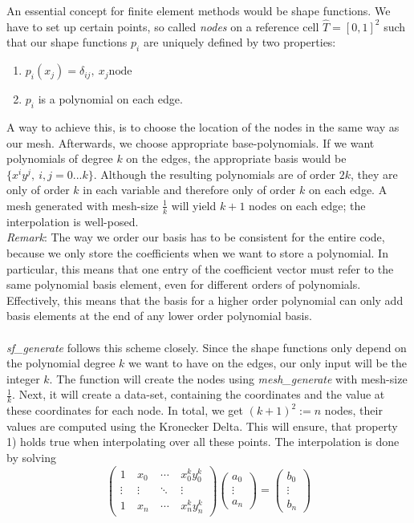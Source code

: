 \documentclass[a4paper,12pt]{article}
\begin{document}
An essential concept for finite element methods would be shape functions. We have to set up certain points, so called \textit{nodes} on a reference cell $\hat T = [0,1]^2$ such that our shape functions $p_i$ are uniquely defined by two properties: 
\begin{enumerate}
\item $p_i(x_j)=\delta_{ij}, \ x_j \mbox{node}$
\item $p_i$ is a polynomial on each edge.
\end{enumerate} 
A way to achieve this, is to choose the location of the nodes in the same way as our mesh. Afterwards, we choose appropriate base-polynomials. If we want polynomials of degree $k$ on the edges, the appropriate basis would be $\{x^iy^j, \ i,j=0...k\}$. Although the resulting polynomials are of order $2k$, they are only of order $k$ in each variable and therefore only of order $k$ on each edge. A mesh generated with mesh-size $\frac{1}{k}$ will yield $k+1$ nodes on each edge; the interpolation is well-posed. \\
\textit{Remark}: The way we order our basis has to be consistent for the entire code, because we only store the coefficients when we want to store a polynomial. In particular, this means that one entry of the coefficient vector must refer to the same polynomial basis element, even for different orders of polynomials. Effectively, this means that the basis for a higher order polynomial can only add basis elements at the end of any lower order polynomial basis. \\
\\
\textit{sf\_generate} follows this scheme closely. Since the shape functions only depend on the polynomial degree $k$ we want to have on the edges, our only input will be the integer $k$. The function will create the nodes using \textit{mesh\_generate} with mesh-size $\frac{1}{k}$. Next, it will create a data-set, containing the coordinates and the value at these coordinates for each node. In total, we get $(k+1)^2:=n$ nodes, their values are computed using the Kronecker Delta. This will ensure, that property 1) holds true when interpolating over all these points. The interpolation is done by solving
\[\begin{pmatrix} 1 &\ x_0 &\ \cdots &\ x_0^ky_0^k \\
\vdots &\ \vdots &\ \ddots &\ \vdots \\ 
1 &\ x_{n} &\ \cdots &\ x_{n}^ky_{n}^k \end{pmatrix}
\begin{pmatrix} a_0 \\ \vdots \\ a_n \end{pmatrix}=\begin{pmatrix} b_0 \\ \vdots \\ b_n \end{pmatrix}\]
\end{document}
